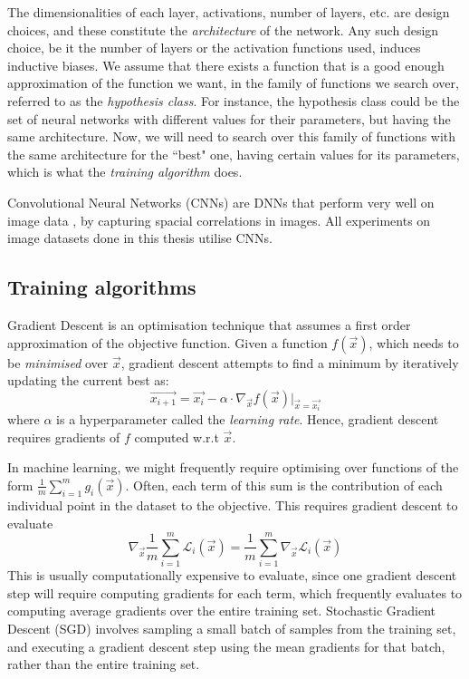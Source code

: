 \documentclass{ociamthesis}
\begin{document}
The dimensionalities of each layer, activations, number of layers, etc. are
design choices, and these constitute the \emph{architecture} of the network. Any
such design choice, be it the number of layers or the activation functions used,
induces inductive biases. We assume that there exists a function that is a good
enough approximation of the function we want, in the family of functions we
search over, referred to as the \emph{hypothesis class}. For instance, the
hypothesis class could be the set of neural networks with different values for
their parameters, but having the same architecture. Now, we will need to search
over this family of functions with the same architecture for the ``best" one,
having certain values for its parameters, which is what the \emph{training
algorithm} does.


Convolutional Neural Networks (CNNs) are DNNs that perform very well on image
data \citep{imagenet,neco.1989.1.4.541}, by capturing spacial correlations in
images. All experiments on image datasets done in this thesis utilise CNNs.

\subsection{Training algorithms}
\label{section:sgd}
Gradient Descent is an optimisation technique that assumes a first order
approximation of the objective function. Given a function $f(\vec{x})$, which
needs to be \emph{minimised} over $\vec{x}$, gradient descent attempts to find a
minimum by iteratively updating the current best as:
\begin{equation*}
    \vec{x_{i+1}}
    = \vec{x_i} -
        \alpha \cdot \nabla_\vec{x} f(\vec{x}) \bigr \rvert _{\vec{x}=\vec{x_i}}
\end{equation*}
where $\alpha$ is a hyperparameter called the \emph{learning rate}. Hence,
gradient descent requires gradients of $f$ computed w.r.t $\vec{x}$.

In machine learning, we might frequently require optimising over functions of
the form $\frac{1}{m}\sum_{i=1}^m g_i(\vec{x})$. Often, each term of this sum is
the contribution of each individual point in the dataset to the objective. This
requires gradient descent to evaluate
\begin{equation*}
    \nabla_\vec{x} \frac{1}{m}\sum_{i=1}^m \mathcal{L}_i(\vec{x})
    = \frac{1}{m} \sum_{i=1}^m \nabla_\vec{x} \mathcal{L}_i(\vec{x})
\end{equation*}
This is usually computationally expensive to evaluate, since one gradient
descent step will require computing gradients for each term, which frequently
evaluates to computing average gradients over the entire training set.
Stochastic Gradient Descent (SGD) involves sampling a small batch of samples
from the training set, and executing a gradient descent step using the mean
gradients for that batch, rather than the entire training set.
\end{document}
